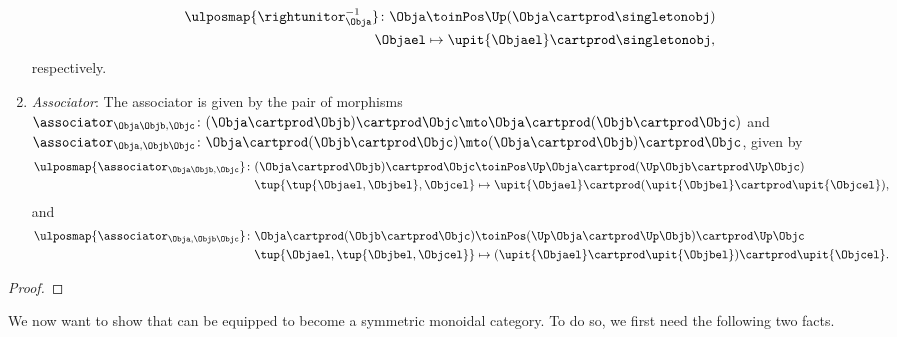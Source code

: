 \begin{lemma}
\begin{enumerate}
\begin{equation}
\begin{aligned}
                      \ulposmap{\rightunitor_{\Obja}^{-1}}\colon \Obja & \toinPos \Up( \Obja \cartprod \singletonobj) \\
                      \Objael                                          & \mapsto \upit \{\Objael\} \cartprod \singletonobj,
                  \end{aligned}
              \end{equation}
              respectively.
        \item \emph{Associator}: The associator is given by the pair of morphisms~$\associator_{\Obja\Objb,\Objc}\colon (\Obja\cartprod \Objb)\cartprod \Objc \mto \Obja\cartprod ( \Objb \cartprod \Objc)$ and~$\associator_{\Obja,\Objb\Objc}\colon \Obja\cartprod (\Objb\cartprod \Objc) \mto (\Obja\cartprod \Objb) \cartprod \Objc$, given by
              \begin{equation}
                  \begin{aligned}
                      \ulposmap{\associator_{\Obja\Objb,\Objc}}\colon (\Obja\cartprod \Objb)\cartprod \Objc & \toinPos \Up \Obja\cartprod (\Up \Objb \cartprod \Up \Objc) \\
                      \tup{\tup{\Objael,\Objbel},\Objcel}                                                   & \mapsto \upit\{\Objael\}\cartprod (\upit\{\Objbel\}\cartprod \upit\{\Objcel\}),
                  \end{aligned}
              \end{equation}
              and
              \begin{equation}
                  \begin{aligned}
                      \ulposmap{\associator_{\Obja,\Objb\Objc}}\colon \Obja\cartprod (\Objb\cartprod \Objc) & \toinPos (\Up \Obja\cartprod \Up \Objb) \cartprod \Up \Objc \\
                      \tup{\Objael,\tup{\Objbel,\Objcel}}                                                   & \mapsto (\upit\{\Objael\}\cartprod \upit\{\Objbel\})\cartprod \upit\{\Objcel\}.
                  \end{aligned}
              \end{equation}
    \end{enumerate}
\end{lemma}
\begin{proof}
\end{proof}

We now want to show that \UPos can be equipped to become a symmetric monoidal category.
To do so, we first need the following two facts.

